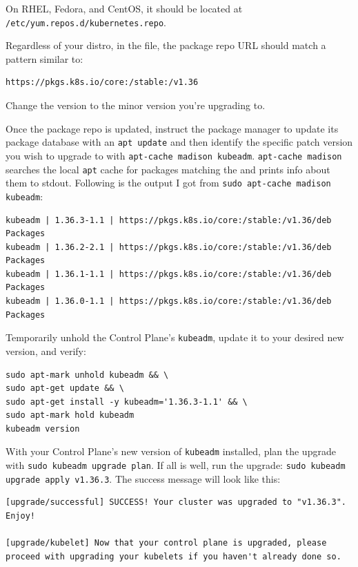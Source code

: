 \documentclass[11pt, a4paper]{article}
\begin{document}
On RHEL, Fedora, and CentOS, it should be located at \texttt{/etc/yum.repos.d/kubernetes.repo}.

Regardless of your distro, in the file, the package repo URL should match a pattern similar to:

\begin{lstlisting}
https://pkgs.k8s.io/core:/stable:/v1.36
\end{lstlisting}

Change the version to the minor version you're upgrading to. 

Once the package repo is updated, instruct the package manager to update its package database with an \texttt{apt update} and then identify the specific patch version you wish to upgrade to with \texttt{apt-cache madison kubeadm}. \texttt{apt-cache madison} searches the local \texttt{apt} cache for packages matching the and prints info about them to stdout. Following is the output I got from \texttt{sudo apt-cache madison kubeadm}:

\begin{lstlisting}
kubeadm | 1.36.3-1.1 | https://pkgs.k8s.io/core:/stable:/v1.36/deb  Packages
kubeadm | 1.36.2-2.1 | https://pkgs.k8s.io/core:/stable:/v1.36/deb  Packages
kubeadm | 1.36.1-1.1 | https://pkgs.k8s.io/core:/stable:/v1.36/deb  Packages
kubeadm | 1.36.0-1.1 | https://pkgs.k8s.io/core:/stable:/v1.36/deb  Packages
\end{lstlisting}

Temporarily unhold the Control Plane's \texttt{kubeadm}, update it to your desired new version, and verify:

\begin{lstlisting}
sudo apt-mark unhold kubeadm && \
sudo apt-get update && \
sudo apt-get install -y kubeadm='1.36.3-1.1' && \
sudo apt-mark hold kubeadm
kubeadm version
\end{lstlisting}

With your Control Plane's new version of \texttt{kubeadm} installed, plan the upgrade with \texttt{sudo kubeadm upgrade plan}. If all is well, run the upgrade: \texttt{sudo kubeadm upgrade apply v1.36.3}. The success message will look like this:

\begin{lstlisting}
[upgrade/successful] SUCCESS! Your cluster was upgraded to "v1.36.3". Enjoy!

[upgrade/kubelet] Now that your control plane is upgraded, please proceed with upgrading your kubelets if you haven't already done so.
\end{lstlisting}
\end{document}
